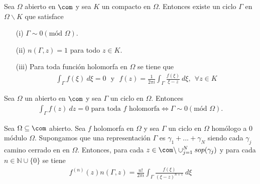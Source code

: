 \begin{teo}
Sea $\Omega$ abierto en $\com$ y sea $K$ un compacto en $\Omega$. Entonces existe un ciclo $\Gamma$ en $\Omega \backslash K$ que satisface
\begin{enumerate}
    \item[(i)] $\Gamma \sim 0 (\text{mód } \Omega)$.
    \item[(ii)] $n(\Gamma,z) = 1$ para todo $z \in K$.
    \item[(iii)] Para toda función holomorfa en $\Omega$ se tiene que
    \begin{align*}
        \int_{\Gamma} f(\xi) \ d\xi = 0 \ \ \ \text{y} \ \ \ f(z) = \frac{1}{2\pi i}\int_{\Gamma} \frac{f(\xi)}{\xi - z} \ d\xi, \ \ \forall z\in K
    \end{align*}
\end{enumerate}
\end{teo}

\begin{teo}
Sea $\Omega$ un abierto en $\com$ y sea $\Gamma$ un ciclo en $\Omega$. Entonces
\begin{align*}
    \int_{\Gamma} f(z) \ dz = 0 \text{ para toda } f \text{ holomorfa}\Longleftrightarrow \Gamma \sim 0 (\text{mód } \Omega).
\end{align*}
\end{teo}

\begin{teo}
Sea $\Omega \subseteq \com$ abierto. Sea $f$ holomorfa en $\Omega$ y sea $\Gamma$ un ciclo en $\Omega$ homólogo a 0 módulo $\Omega$. Supongamos que una representación $\Gamma$ es $\gamma_1 + ... + \gamma_N$ siendo cada $\gamma_j$ camino cerrado en en $\Omega$. Entonces, para cada $z \in \com \backslash \cup_{j=1}^{N} sop(\gamma_j)$ y para cada $n \in \mathbb{N} \cup \{0\}$ se tiene 
\begin{align*}
    f^{(n)}(z)n(\Gamma,z) = \frac{n!}{2\pi i} \int_{\Gamma} \frac{f(\xi)}{(\xi - z)^{n+1}} \ d\xi
\end{align*}
\end{teo}

